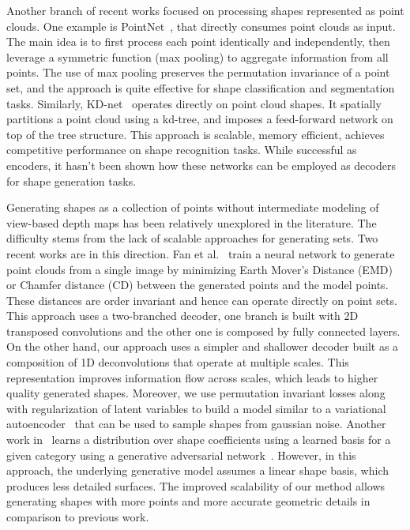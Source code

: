 Another branch of recent works focused on processing shapes represented as point clouds. One example is PointNet~\cite{pointnet,pointnet2}, that directly consumes point clouds as input. The main idea is to first process each point identically and independently, then leverage a symmetric function (max pooling) to aggregate information from all points. The use of max pooling preserves the permutation invariance of a point set, and the approach is quite effective for shape classification and segmentation tasks. Similarly, KD-net~\cite{Klokov_2017_ICCV} operates directly on point cloud shapes. It spatially partitions a point cloud using a kd-tree, and imposes a feed-forward network on top of the tree structure. This approach is scalable, memory efficient, achieves competitive performance on shape recognition tasks. 
While successful as encoders, it hasn't been shown how these networks can be employed as decoders for shape generation tasks.



Generating shapes as a collection of points without intermediate modeling of view-based depth maps has been relatively unexplored in the literature.
The difficulty stems from the lack of scalable approaches for generating sets.
Two recent works are in this direction.
Fan et al.~\cite{fan2016point} train a neural network to generate point clouds from a single image by minimizing Earth Mover's Distance (EMD) or Chamfer distance (CD) between the generated points and the model points. These distances are order invariant and hence can operate directly on point sets. 
This approach uses a two-branched decoder, one branch is built with 2D transposed convolutions and the other one is composed by fully connected layers.
On the other hand, our approach uses a simpler and shallower decoder built as a composition of 1D deconvolutions that operate at multiple scales.
This representation improves information flow across scales, which leads to higher quality generated shapes. 
Moreover, we use permutation invariant losses along with regularization of latent variables to build a model similar to a variational autoencoder~\cite{vae}
that can be used to sample shapes from gaussian noise.
Another work in~\cite{Gadhela:2017:3DSG} learns a distribution over shape coefficients using a learned basis for a given category using a generative adversarial network~\cite{goodfellow2014generative}. 
However, in this approach, the underlying generative model assumes a linear shape basis, which produces less detailed surfaces. 
The improved scalability of our method allows generating shapes with more points and more accurate geometric details in comparison to previous work.




